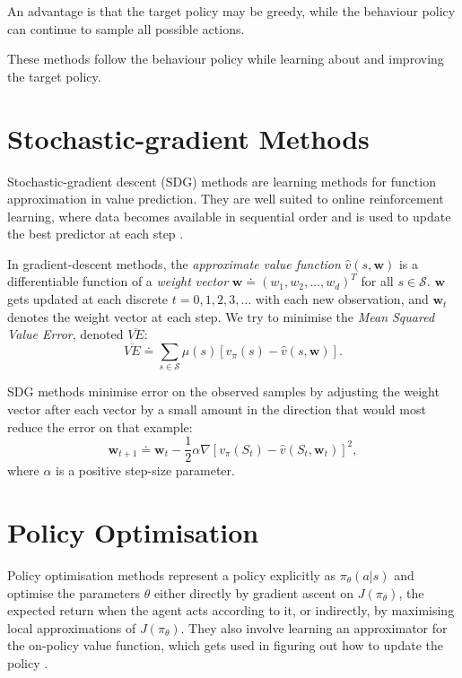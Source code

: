 \documentclass{article}
\begin{document}
An advantage is that the target policy may be greedy, while the
behaviour policy can continue to sample all possible actions.

These methods follow the behaviour policy while learning about and
improving the target policy.

\section{Stochastic-gradient Methods}

Stochastic-gradient descent (SDG) methods are learning methods for function approximation in value prediction. They are well suited to online reinforcement learning, where data becomes available in sequential order and is used to update the best predictor at each step \cite{Mnih2015}.

In gradient-descent methods, the \textit{approximate value function} $\hat{v}(s,\mathbf{w})$ is a differentiable function of a \textit{weight vector} $\mathbf{w} \doteq (w_1, w_2, \dots, w_d)^T$ for all $s \in \mathcal{S}$. $\mathbf{w}$ gets updated at each discrete $t = 0, 1, 2, 3, \dots$ with each new observation, and $\mathbf{w}_t$ denotes the weight vector at each step. We try to minimise the \textit{Mean Squared Value Error}, denoted $\overline{VE}$: $$\overline{VE} \doteq \sum_{s \in \mathcal{S}} \mu(s) \left[ v_\pi(s) - \hat{v}(s, \mathbf{w})\right].$$

SDG methods minimise error on the observed samples by adjusting the weight vector after each vector by a small amount in the direction that would most reduce the error on that example: $$\mathbf{w}_{t+1} \doteq \mathbf{w}_t - \frac{1}{2} \alpha \nabla \left[ v_\pi(S_t) - \hat{v}(S_t, \mathbf{w}_t)\right]^2,$$ where $\alpha$ is a positive step-size parameter.

\section{Policy Optimisation}

Policy optimisation methods represent a policy explicitly as $\pi_\theta(a|s)$ and optimise the parameters $\theta$ either directly by gradient ascent on $J(\pi_\theta)$, the expected return when the agent acts according to it, or indirectly, by maximising local approximations of $J(\pi_\theta)$. They also involve learning an approximator for the on-policy value function, which gets used in figuring out how to update the policy \cite{openai_2018}.
\end{document}
